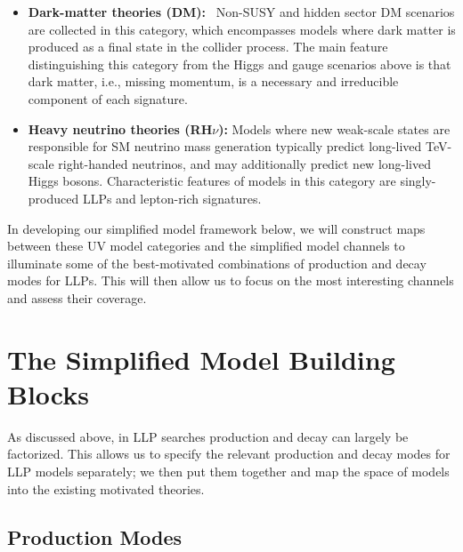 \begin{itemize}
\item {\bf Dark-matter theories (DM):}~ Non-SUSY and hidden sector DM scenarios are collected in this category, which encompasses models where dark matter is produced as a final state in the collider process. The main feature distinguishing this category from the Higgs and gauge scenarios above is that dark matter, i.e., missing momentum, is a necessary and irreducible component of each signature.

\item {\bf Heavy neutrino theories (RH$\nu$):}  Models where  new weak-scale states are responsible for SM neutrino mass generation typically predict long-lived TeV-scale right-handed neutrinos, and may additionally predict new long-lived Higgs bosons.  Characteristic features of models in this category are singly-produced LLPs and lepton-rich signatures.

\end{itemize}

%
In developing our simplified model framework below, we will construct maps between these UV model categories and the simplified model channels to illuminate some of the best-motivated combinations of production and decay modes for LLPs. This will then allow us to focus on the most interesting channels and assess their coverage.


\section{The Simplified Model Building Blocks}\label{sec:building_blocks}


As discussed above, in LLP searches production and decay can largely be factorized. This allows us to specify the relevant production and decay modes for LLP models separately; we then put them together and map the space of models into the existing motivated theories.

\subsection{Production Modes}

